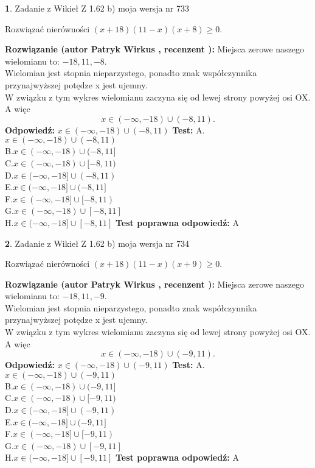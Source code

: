 \documentclass[12pt, a4paper]{article}
\theoremstyle{definition} %
\newtheorem{zad}{}
\newcommand{\zadStart}[1]{\begin{zad}#1\newline}
\newcommand{\zadStop}{\end{zad}}
\newcommand{\rozwStart}[2]{\noindent \textbf{Rozwiązanie (autor #1 , recenzent #2): }\newline}
\newcommand{\rozwStop}{\newline}
\newcommand{\odpStart}{\noindent \textbf{Odpowiedź:}\newline}
\newcommand{\odpStop}{\newline}
\newcommand{\testStart}{\noindent \textbf{Test:}\newline}
\newcommand{\testStop}{\newline}
\newcommand{\kluczStart}{\noindent \textbf{Test poprawna odpowiedź:}\newline}
\newcommand{\kluczStop}{\newline}
\begin{document}
\zadStart{Zadanie z Wikieł Z 1.62 b) moja wersja nr 733}

Rozwiązać nierówności $(x+18)(11-x)(x+8)\ge0$.
\zadStop
\rozwStart{Patryk Wirkus}{}
Miejsca zerowe naszego wielomianu to: $-18, 11, -8$.\\
Wielomian jest stopnia nieparzystego, ponadto znak współczynnika przy\linebreak najwyższej potędze x jest ujemny.\\ W związku z tym wykres wielomianu zaczyna się od lewej strony powyżej osi OX. A więc $$x \in (-\infty,-18) \cup (-8,11).$$
\rozwStop
\odpStart
$x \in (-\infty,-18) \cup (-8,11)$
\odpStop
\testStart
A.$x \in (-\infty,-18) \cup (-8,11)$\\
B.$x \in (-\infty,-18) \cup (-8,11]$\\
C.$x \in (-\infty,-18) \cup [-8,11)$\\
D.$x \in (-\infty,-18] \cup (-8,11)$\\
E.$x \in (-\infty,-18] \cup (-8,11]$\\
F.$x \in (-\infty,-18] \cup [-8,11)$\\
G.$x \in (-\infty,-18) \cup [-8,11]$\\
H.$x \in (-\infty,-18] \cup [-8,11]$
\testStop
\kluczStart
A
\kluczStop



\zadStart{Zadanie z Wikieł Z 1.62 b) moja wersja nr 734}

Rozwiązać nierówności $(x+18)(11-x)(x+9)\ge0$.
\zadStop
\rozwStart{Patryk Wirkus}{}
Miejsca zerowe naszego wielomianu to: $-18, 11, -9$.\\
Wielomian jest stopnia nieparzystego, ponadto znak współczynnika przy\linebreak najwyższej potędze x jest ujemny.\\ W związku z tym wykres wielomianu zaczyna się od lewej strony powyżej osi OX. A więc $$x \in (-\infty,-18) \cup (-9,11).$$
\rozwStop
\odpStart
$x \in (-\infty,-18) \cup (-9,11)$
\odpStop
\testStart
A.$x \in (-\infty,-18) \cup (-9,11)$\\
B.$x \in (-\infty,-18) \cup (-9,11]$\\
C.$x \in (-\infty,-18) \cup [-9,11)$\\
D.$x \in (-\infty,-18] \cup (-9,11)$\\
E.$x \in (-\infty,-18] \cup (-9,11]$\\
F.$x \in (-\infty,-18] \cup [-9,11)$\\
G.$x \in (-\infty,-18) \cup [-9,11]$\\
H.$x \in (-\infty,-18] \cup [-9,11]$
\testStop
\kluczStart
A
\kluczStop
\end{document}
